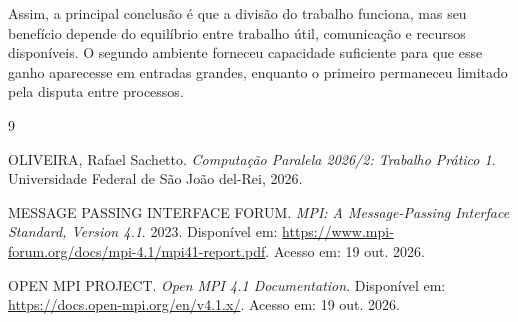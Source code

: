 \documentclass[12pt,a4paper]{article}
\begin{document}
Assim, a principal conclusão é que a divisão do trabalho funciona, mas seu
benefício depende do equilíbrio entre trabalho útil, comunicação e recursos
disponíveis. O segundo ambiente forneceu capacidade suficiente para que esse
ganho aparecesse em entradas grandes, enquanto o primeiro permaneceu limitado
pela disputa entre processos.

\begin{thebibliography}{9}

OLIVEIRA, Rafael Sachetto.
\textit{Computação Paralela 2026/2: Trabalho Prático 1}.
Universidade Federal de São João del-Rei, 2026.

MESSAGE PASSING INTERFACE FORUM.
\textit{MPI: A Message-Passing Interface Standard, Version 4.1}.
2023. Disponível em:
\url{https://www.mpi-forum.org/docs/mpi-4.1/mpi41-report.pdf}.
Acesso em: 19 out. 2026.

OPEN MPI PROJECT.
\textit{Open MPI 4.1 Documentation}.
Disponível em: \url{https://docs.open-mpi.org/en/v4.1.x/}.
Acesso em: 19 out. 2026.

\end{thebibliography}
\end{document}
